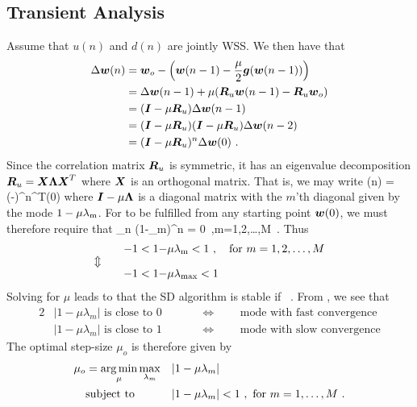 \subsection{Transient Analysis}
Assume that $u(n)$ and $d(n)$ are jointly WSS. We then have that
\begin{align}
  \Delta\boldsymbol{w}(n) &= \boldsymbol{w}_o - \left(\boldsymbol{w}(n-1)-\frac{\mu}{2}\boldsymbol{g}(\boldsymbol{w}(n-1))\right)\\
  &= \Delta\boldsymbol{w}(n-1) + \mu(\boldsymbol{R}_u\boldsymbol{w}(n-1)-\boldsymbol{R}_u\boldsymbol{w}_o)\\
  &= (\boldsymbol{I}-\mu\boldsymbol{R}_u)\Delta\boldsymbol{w}(n-1)\\
  &= (\boldsymbol{I}-\mu\boldsymbol{R}_u)(\boldsymbol{I}-\mu\boldsymbol{R}_u)\Delta\boldsymbol{w}(n-2)\\
  &= (\boldsymbol{I}-\mu\boldsymbol{R}_u)^n\Delta\boldsymbol{w}(0)\ .
\end{align}
Since the correlation matrix $\boldsymbol{R}_u$ is symmetric, it has an eigenvalue decomposition $\boldsymbol{R}_u=\boldsymbol{X\Lambda X}^T$ where $\boldsymbol{X}$ is an orthogonal matrix. That is, we may write
\bmath
  \Delta{}(n) = (-\mu\vect{\Lambda})^n^T\Delta{}(0)
\emath
where $\boldsymbol{I}-\mu\boldsymbol{\Lambda}$ is a diagonal matrix with the $m$'th diagonal given by the mode $1-\mu\lambda_\textup{m}$. For  to be fulfilled from any starting point $\boldsymbol{w}(0)$, we must therefore require that
\bmath
  \lim_{n\to\infty} (1-\mu\lambda_\textup{m})^n = 0\ ,\quad{}m=1,2,\ldots,M\ .
  \label{eq:sd_mode}
\emath
Thus
\begin{alignat}{2}
  && -1 < 1-&\mu\lambda_\textup{m} < 1\ ,\quad\text{for }m=1,2,\ldots,M\\
  \ArrowBetweenLines
  && -1 < 1-&\mu\lambda_\textup{max} < 1
\end{alignat}
Solving for $\mu$ leads to that the SD algorithm is stable if
\bmath
  \ .
\emath
From , we see that
\begin{alignat*}{2}
  &|1-\mu\lambda_m|\text{ is close to 0} &\qquad &\iff\qquad\text{ mode with fast convergence}\\
  &|1-\mu\lambda_m|\text{ is close to 1} &\qquad &\iff\qquad\text{ mode with slow convergence}
\end{alignat*}
The optimal step-size $\mu_o$ is therefore given by
\begin{alignat}{2}
  \mu_o&= \argmin_{\mu} \max_{\lambda_m} & |1-\mu\lambda_m|&\\
  &\text{subject to }             & |1-\mu\lambda_m|&<1\ ,\text{ for } m=1,\ldots,M\ .
\end{alignat}
